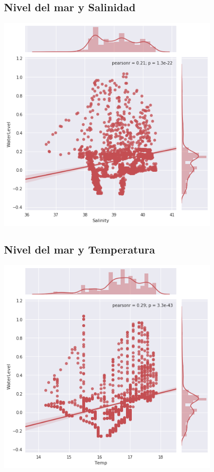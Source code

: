 \documentclass{article}
\begin{document}
\begin{figure}
\subsection{Nivel del mar y Salinidad}
\includegraphics[width=\linewidth]{water-salinity.png}
\end{figure}
\begin{figure}
\subsection{Nivel del mar y Temperatura}
\includegraphics[width=\linewidth]{water-temp.png}
\end{figure}
\end{document}

